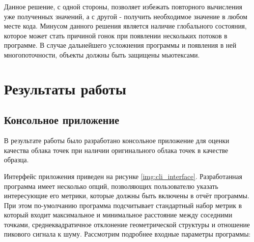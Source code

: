 Данное решение, с одной стороны, позволяет избежать повторного вычисления уже
полученных значений, а с другой - получить необходимое значение в любом месте
кода. Минусом данного решения является наличие глобального состояния, которое
может стать причиной гонок при появлении нескольких потоков в программе. В
случае дальнейшего усложнения программы и появления в ней многопоточности,
объекты должны быть защищены мьютексами.



\newpage
\chapter{Результаты работы}

\section{Консольное приложение}

В результате работы было разработано консольное приложение для оценки качества
облака точек при наличии оригинального облака точек в качестве образца.


Интерфейс приложения приведен на рисунке \ref{img:cli_interface}. Разработанная
программа имеет несколько опций, позволяющих пользователю указать интересующие
его метрики, которые должны быть включены в отчёт программы. При этом
по-умолчанию программа подсчитывает стандартный набор метрик в который входит
максимальное и минимальное расстояние между соседними точками,
среднеквадратичное отклонение геометрической структуры и отношение пикового
сигнала к шуму. Рассмотрим подробнее входные параметры программы:


